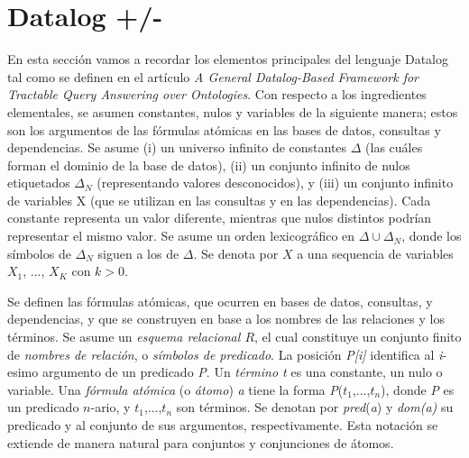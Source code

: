\documentclass[11pt,a4paper,twoside]{tesis}
\begin{document}
\section{Datalog +/-}\label{seccion_datalog}

En esta sección vamos a recordar los elementos principales del lenguaje Datalog tal como se definen en el artículo \textit{A General Datalog-Based Framework for
Tractable Query Answering over Ontologies}\cite{JWS}.
Con respecto a los ingredientes elementales, se asumen constantes, nulos y variables de la siguiente manera; estos son los argumentos de las fórmulas atómicas en las bases de datos, consultas y dependencias.
Se asume (i) un universo infinito de constantes  $\Delta$ (las cuáles forman el dominio de la base de  datos), (ii) un conjunto infinito de nulos etiquetados $\Delta_{N}$ (representando valores desconocidos), y (iii) un conjunto infinito de variables X (que se utilizan en las consultas y en las dependencias). Cada constante representa un valor diferente, mientras que nulos distintos podrían representar el mismo valor. 
Se asume un orden lexicográfico en  $\Delta \cup \Delta_{N}$, donde los símbolos de $\Delta_{N}$ siguen a los de $\Delta$. Se denota por $X$ a una sequencia de variables $X_{1}$, ..., $X_{K}$ con $k > 0$.

Se definen las fórmulas atómicas, que ocurren en bases de datos, consultas, y dependencias, y que se construyen en base a los nombres de las relaciones y los términos. Se asume un \textit{esquema relacional $R$}, el cual constituye un conjunto finito de \textit{nombres de relación}, o \textit{símbolos de predicado}. La posición \textit{P[i]} identifica al \textit{i}-esimo argumento de un predicado \textit{P}. Un \textit{término t} es una constante, un nulo o variable. Una \textit{fórmula atómica} (o \textit{átomo}) \textit{a} tiene la forma \textit{P}($t_{1}$,...,$t_{n}$), donde \textit{P} es un predicado $n$-ario, y $t_{1}$,...,$t_{n}$ son términos. Se denotan por \textit{pred}(\textit{a}) y \textit{dom(a)} su predicado y al conjunto de sus argumentos, respectivamente. Esta notación se extiende de manera natural para conjuntos y conjunciones de átomos. 
\end{document}
